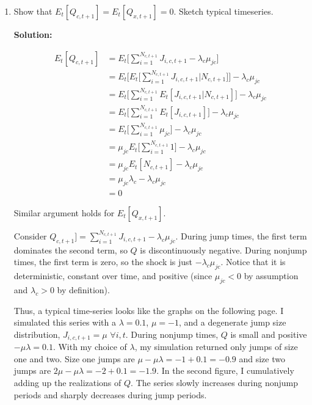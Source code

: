 \documentclass{article}
\begin{document}
\begin{enumerate}

\item Show that $E_t[Q_{c,t+1}] = E_t[Q_{x,t+1}] = 0$. Sketch typical timeseries.

\textbf{Solution:}

\begin{align*}
E_t[Q_{c,t+1}] 
&= E_t \Bigg[ \sum_{i=1}^{N_{c,t+1}} J_{i,c,t+1} - \lambda_c \mu_{jc} \Bigg]\\
&= E_t \Bigg[E_t \Bigg[ \sum_{i=1}^{N_{c,t+1}} J_{i,c,t+1}\Bigg| N_{c,t+1}\Bigg]\Bigg] - \lambda_c \mu_{jc} \\
&= E_t \Bigg[\sum_{i=1}^{N_{c,t+1}} E_t [ J_{i,c,t+1}| N_{c,t+1}]\Bigg] - \lambda_c \mu_{jc} \\
&= E_t \Bigg[\sum_{i=1}^{N_{c,t+1}} E_t [ J_{i,c,t+1}]\Bigg] - \lambda_c \mu_{jc} \\
&= E_t \Bigg[\sum_{i=1}^{N_{c,t+1}} \mu_{jc}\Bigg] - \lambda_c \mu_{jc} \\
&= \mu_{jc}E_t \Bigg[\sum_{i=1}^{N_{c,t+1}}1 \Bigg] - \lambda_c \mu_{jc} \\
&= \mu_{jc}E_t[N_{c,t+1} ] - \lambda_c \mu_{jc} \\
&= \mu_{jc} \lambda_c - \lambda_c \mu_{jc} \\
&= 0
\end{align*}

Similar argument holds for $E_t[Q_{x,t+1}]$.  

\bigskip

Consider $Q_{c,t+1}] =\sum_{i=1}^{N_{c,t+1}} J_{i,c,t+1} - \lambda_c \mu_{jc}$. During jump times, the first term dominates the second term, so $Q$ is discontinuously negative.  During nonjump times, the first term is zero, so the shock is just $- \lambda_c \mu_{jc}$.  Notice that it is deterministic, constant over time, and positive (since $\mu_{jc} < 0$ by assumption and $\lambda_c > 0$ by definition).  

\bigskip

Thus, a typical time-series looks like the graphs on the following page.  I simulated this series with a $\lambda = 0.1$, $\mu = -1$, and a degenerate jump size distribution, $J_{i,c,t+1} = \mu$ $\forall i, t$.  During nonjump times, $Q$ is small and positive $-\mu\lambda = 0.1$.  With my choice of $\lambda$, my simulation returned only jumps of size one and two.  Size one jumps are $\mu - \mu \lambda = -1 + 0.1 = -0.9$ and size two jumps are $2\mu - \mu \lambda = -2 + 0.1 = -1.9$. In the second figure, I cumulatively adding up the realizations of $Q$.  The series slowly increases during nonjump periods and sharply decreases during jump periods.


\end{enumerate}
\end{document}
